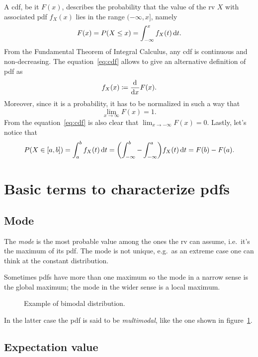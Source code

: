 \documentclass[
	10pt,
	draft
]{scrreprt}
\newcommand{\deriv}[3][]{\dfrac{\ud^{#1}#2}{\ud #3^{#1}}}%
\begin{document}
A \ac{cdf}, be it $F(x)$, describes the probability that the value of the \ac{rv} $X$ with associated \ac{pdf} $f_X(x)$ lies in the range $(-\infty,x]$, namely
\begin{equation}\label{eq:cdf}
F(x) = P(X\le x) = \int_{-\infty}^x f_X(t)\mathop{}\!\mathrm{d} t.
\end{equation}
From the Fundamental Theorem of Integral Calculus, any \ac{cdf} is continuous and non-decreasing.
The equation~\eqref{eq:cdf} allows to give an alternative definition of \ac{pdf} as
\begin{equation}
f_X(x)\coloneqq \deriv{}{x}F(x).
\end{equation}
Moreover, since it is a probability, it has to be normalized in such a way that
\begin{equation}
\lim_{x\to\infty}F(x) = 1.
\end{equation}
From the equation~\eqref{eq:cdf} is also clear that $\lim_{x\to-\infty}F(x) = 0$.
Lastly, let's notice that
\begin{equation}
P(X\in[a,b]) = \int_a^b f_X(t)\mathop{}\!\mathrm{d} t = \biggl(\int_{-\infty}^b - \int_{-\infty}^a\biggr) f_X(t)\mathop{}\!\mathrm{d} t = F(b) - F(a).
\end{equation}

		\section{Basic terms to characterize \acsp{pdf}}
			\subsection{Mode}

The \emph{mode} is the most probable value among the ones the \ac{rv} can assume, i.e.~it's the maximum of its \ac{pdf}.
The mode is not unique, e.g.~as an extreme case one can think at the constant distribution.


Sometimes \acp{pdf} have more than one maximum so the mode in a narrow sense is the global maximum; the mode in the wider sense is a local maximum.
\begin{figure}
	\centering

	\caption{Example of bimodal distribution.}
	\label{fig:multiModalPDF}
\end{figure}
In the latter case the \ac{pdf} is said to be \emph{multimodal}, like the one shown in figure~\ref{fig:multiModalPDF}.


			\subsection{Expectation value}
\end{document}
